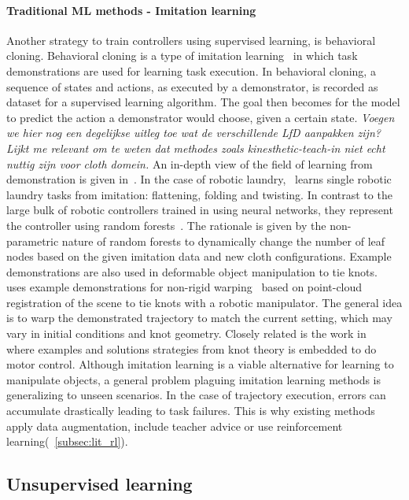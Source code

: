 \documentclass[\home/main.tex]{subfiles}
\begin{document}
\paragraph{Traditional ML methods - Imitation learning}
Another strategy to train controllers using supervised learning, is behavioral cloning. Behavioral cloning is a type of imitation learning~\autocite{Argall2009} in which task demonstrations are used for learning task execution. In behavioral cloning, a sequence of states and actions, as executed by a demonstrator, is recorded as dataset for a supervised learning algorithm. The goal then becomes for the model to predict the action a demonstrator would choose, given a certain state. \emph{Voegen we hier nog een degelijkse uitleg toe wat de verschillende LfD aanpakken zijn? Lijkt me relevant om te weten dat methodes zoals kinesthetic-teach-in niet echt nuttig zijn voor cloth domein.} An in-depth view of the field of learning from demonstration is given in~\autocite{Argall2009}. In the case of robotic laundry,~\textcite{Jia2019} learns single robotic laundry tasks from imitation: flattening, folding and twisting. In contrast to the large bulk of robotic controllers trained in \citeyear{Jia2019} using neural networks, they represent the controller using random forests~\autocite{Breiman2001}. The rationale is given by the non-parametric nature of random forests to dynamically change the number of leaf nodes based on the given imitation data and new cloth configurations. Example demonstrations are also used in deformable object manipulation to tie knots. ~\textcite{Schulman2016learning} uses example demonstrations for non-rigid warping~\autocite{Chui2003} based on point-cloud registration of the scene to tie knots with a robotic manipulator. The general idea is to warp the demonstrated trajectory to match the current setting, which may vary in initial conditions and knot geometry. Closely related is the work in~\autocite{Morita2003} where examples and solutions strategies from knot theory is embedded to do motor control. Although imitation learning is a viable alternative for learning to manipulate objects, a general problem plaguing imitation learning methods is generalizing to unseen scenarios. In the case of trajectory execution, errors can accumulate drastically leading to task failures. This is why existing methods apply data augmentation, include teacher advice or use reinforcement learning(~\cref{subsec:lit_rl}).

\subsection{Unsupervised learning}
\end{document}

